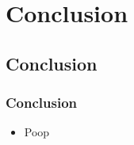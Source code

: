 \section{Conclusion}

\subsection{Conclusion}

\begin{frame}
    \frametitle{Conclusion}
    \begin{itemize}
        \item Poop
    \end{itemize}
\end{frame}
